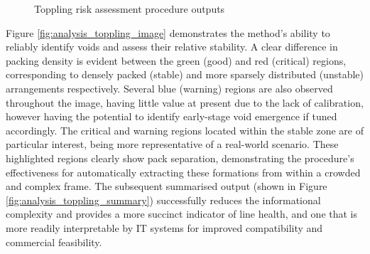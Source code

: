 \documentclass[10pt]{article}
\begin{document}
\begin{figure}[h]%
    \centering
    \qquad %
    \qquad %
    \caption{Toppling risk assessment procedure outputs}
    \label{fig:analysis_toppling_master}%
\end{figure}

Figure \ref{fig:analysis_toppling_image} demonstrates the method's ability to reliably identify voids and assess their relative stability. A clear difference in packing density is evident between the green (good) and red (critical) regions, corresponding to densely packed (stable) and more sparsely distributed (unstable) arrangements respectively. Several blue (warning) regions are also observed throughout the image, having little value at present due to the lack of calibration, however having the potential to identify early-stage void emergence if tuned accordingly. The critical and warning regions located within the stable zone are of particular interest, being more representative of a real-world scenario. These highlighted regions clearly show pack separation, demonstrating the procedure's effectiveness for automatically extracting these formations from within a crowded and complex frame. The subsequent summarised output (shown in Figure \ref{fig:analysis_toppling_summary}) successfully reduces the informational complexity and provides a more succinct indicator of line health, and one that is more readily interpretable by IT systems for improved compatibility and commercial feasibility. 
\end{document}
